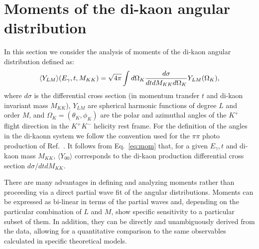 \documentclass[twocolumn,superscriptaddress,prd]{revtex4}
\def\m{M}
\def\l{L}
\begin{document}
\section{\label{sec:mom} Moments of the di-kaon angular distribution}\label{par:fin_results} 
In this section we consider the analysis of moments of the  di-kaon angular distribution defined as:
\begin{equation}\label{eq:mom}
\langle Y_{\l\m} \rangle(E_\gamma,t,M_{KK}) = \sqrt{4\pi} \int d\Omega_K  {{d\sigma} \over {dt dM_{KK} d\Omega_K}} Y_{\l\m}(\Omega_K),
\end{equation} 
where $d\sigma$ is the differential cross section (in momentum transfer $t$ and di-kaon invariant mass $M_{KK}$), $Y_{\l\m}$ are
spherical harmonic functions of degree $\l$ and order $\m$,  and 
$\Omega_K = (\theta_K , \phi_K)$ are the polar and azimuthal angles of the $K^+$ flight direction
in the $K^+K^-$ helicity rest frame. For the definition of the angles in the di-kaonn system we follow the convention used for the $\pi \pi$ photo production of  Ref.~\cite{Ballam_1}.
It follows from  Eq.~\ref{eq:mom} that,
for a given $E_\gamma,t$ and di-kaon mass $M_{KK}$,
$\langle Y_{00}\rangle$ corresponds to the di-kaon production  differential 
cross section $d\sigma/dtdM_{KK}$. 

There are many advantages in defining and analyzing moments rather than proceeding via a direct partial wave fit of the angular distributions.
Moments  can  be  expressed as bi-linear in terms of the partial waves and, 
depending on the particular combination of $L$ and $M$,  show specific sensitivity to  a particular subset of them.
In addition, they can be directly and
unambiguously derived from the data, allowing for a quantitative comparison to the same observables calculated in specific theoretical models.
\end{document}
